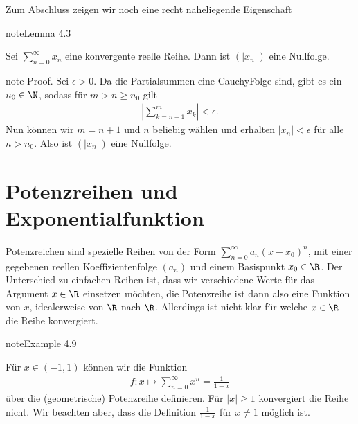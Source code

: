 \documentclass[letterpaper,10pt,english]{jupyterBook}
\begin{document}
Zum Abschluss zeigen wir noch eine recht naheliegende Eigenschaft
\label{metrik/reihen:lemma-9}
\begin{sphinxadmonition}{note}{Lemma 4.3}



Sei \(\sum_{n=0}^\infty x_n\) eine konvergente reelle Reihe. Dann ist \((|x_n|)\) eine Nullfolge.
\end{sphinxadmonition}

\begin{sphinxadmonition}{note}
Proof.  Sei \(\epsilon >0 \). Da die Partialsummen eine Cauchy\sphinxhyphen{}Folge sind, gibt es ein \(n_0 \in \N\), sodass für \(m>n\geq n_0\) gilt
\begin{equation*}
\begin{split}|\sum_{k=n+1}^m x_k| < \epsilon.\end{split}
\end{equation*}
Nun können wir \(m=n+1\) und \(n\) beliebig wählen und erhalten \(|x_n|<\epsilon\) für alle \(n > n_0\). Also ist \((|x_n|)\)
eine Nullfolge.
\end{sphinxadmonition}


\section{Potenzreihen und Exponentialfunktion}
\label{\detokenize{metrik/potenzreihen:potenzreihen-und-exponentialfunktion}}\label{\detokenize{metrik/potenzreihen::doc}}
Potenzreichen sind spezielle Reihen von der Form \(\sum_{n=0}^\infty a_n (x-x_0)^n\), mit einer gegebenen reellen Koeffizientenfolge \((a_n)\) und einem Basispunkt \(x_0 \in \R\). Der Unterschied zu einfachen Reihen ist, dass wir verschiedene Werte für das Argument \(x\in \R\) einsetzen möchten, die Potenzreihe ist dann also eine Funktion von \(x\), idealerweise von \(\R\) nach \(\R\). Allerdings ist nicht klar für welche \(x \in \R\) die Reihe konvergiert.
\label{metrik/potenzreihen:example-0}
\begin{sphinxadmonition}{note}{Example 4.9}



Für \(x \in (-1,1)\) können wir die Funktion
\begin{equation*}
\begin{split} f: x \mapsto \sum_{n=0}^\infty x^n = \frac{1}{1-x}\end{split}
\end{equation*}
über die (geometrische) Potenzreihe definieren. Für \(|x| \geq 1\) konvergiert die Reihe nicht. Wir beachten aber, dass die Definition \(\frac{1}{1-x}\) für \(x\neq 1\) möglich ist.
\end{sphinxadmonition}
\end{document}

